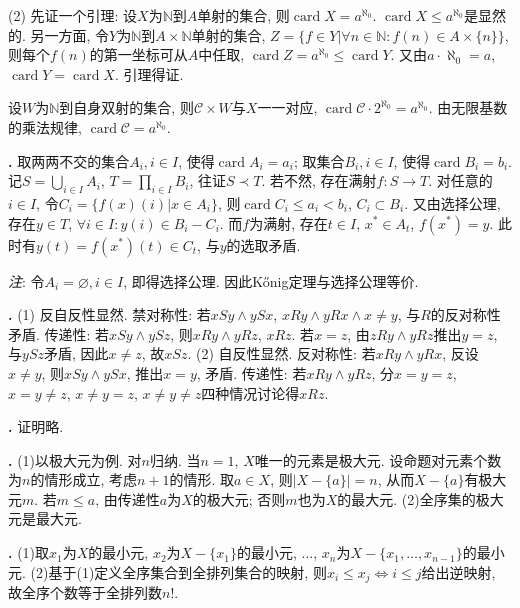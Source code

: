 (2) 先证一个引理: 设$X$为$\mathbb{N}$到$A$单射的集合, 则$\operatorname{card} X = a^{\aleph_0}$. $\operatorname{card} X \le a^{\aleph_0}$是显然的. 另一方面, 令$Y$为$\mathbb{N}$到$A\times \mathbb{N}$单射的集合, $Z=\{f\in Y\vert \forall n\in \mathbb{N}: f(n)\in A\times \{n\}\}$, 则每个$f(n)$的第一坐标可从$A$中任取, $\operatorname{card}Z=a^{\aleph_0}\le \operatorname{card} Y$. 又由$a \cdot \aleph_0 = a$, $\operatorname{card} Y=\operatorname{card} X$. 引理得证. 
\par 设$W$为$\mathbb{N}$到自身双射的集合, 则$\mathcal{C}\times W$与$X$一一对应, $\operatorname{card}\mathcal{C} \cdot 2^{\aleph_0} = a^{\aleph_0}$. 由无限基数的乘法规律, $\operatorname{card}\mathcal{C}=a^{\aleph_0}$.

\par \textbf{\thesolset .} 取两两不交的集合$A_i, i\in I$, 使得$\operatorname{card} A_i=a_i$; 取集合$B_i, i\in I$, 使得$\operatorname{card} B_i=b_i$. 记$S=\bigcup_{i\in I} A_i$, $T=\prod_{i\in I} B_i$, 往证$S \prec T$. 若不然, 存在满射$f: S\to T$. 对任意的$i\in I$, 令$C_i = \{f(x)(i)\vert x\in A_i\}$, 则$\operatorname{card} C_i \le a_i < b_i$, $C_i \subset B_i$. 又由选择公理, 存在$y \in T$, $\forall i\in I: y(i) \in B_i-C_i$. 而$f$为满射, 存在$t\in I$, $x^* \in A_t$, $f(x^*)=y$. 此时有$y(t)=f(x^*)(t)\in C_t$, 与$y$的选取矛盾. 

\emph{注}: 令$A_i=\varnothing, i\in I$, 即得选择公理. 因此Kőnig定理与选择公理等价.  

\par \textbf{\thesolset .} (1) 反自反性显然. 禁对称性: 若$xSy\land ySx$, $xRy \land yRx \land x\neq y$, 与$R$的反对称性矛盾. 传递性: 若$xSy\land ySz$, 则$xRy \land yRz$, $xRz$. 若$x=z$, 由$zRy \land yRz$推出$y=z$, 与$ySz$矛盾, 因此$x\neq z$, 故$xSz$. (2) 自反性显然. 反对称性: 若$xRy \land yRx$, 反设$x\neq y$, 则$xSy \land ySx$, 推出$x=y$, 矛盾. 传递性: 若$xRy \land yRz$, 分$x=y=z$, $x=y\neq z$, $x\neq y=z$, $x\neq y\neq z$四种情况讨论得$xRz$. 

\par \textbf{\thesolset .} 证明略. 

\par \textbf{\thesolset .} (1)以极大元为例. 对$n$归纳. 当$n=1$, $X$唯一的元素是极大元. 设命题对元素个数为$n$的情形成立, 考虑$n+1$的情形. 取$a\in X$, 则$|X-\{a\}|=n$, 从而$X-\{a\}$有极大元$m$. 若$m\le a$, 由传递性$a$为$X$的极大元; 否则$m$也为$X$的最大元. (2)全序集的极大元是最大元.  

\par \textbf{\thesolset .} (1)取$x_1$为$X$的最小元, $x_2$为$X-\{x_1\}$的最小元, ..., $x_n$为$X-\{x_1,\dots, x_{n-1}\}$的最小元. (2)基于(1)定义全序集合到全排列集合的映射, 则$x_i\le x_j \iff i\le j$给出逆映射, 故全序个数等于全排列数$n!$. 

